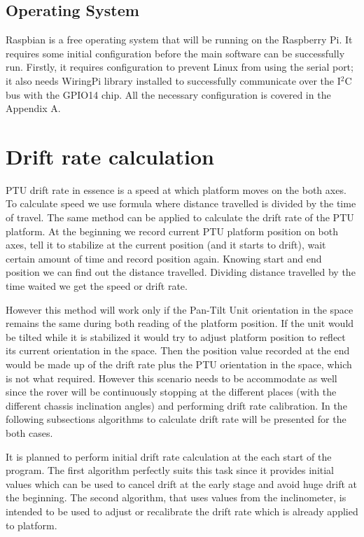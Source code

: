 \subsection{Operating System}
Raspbian is a free operating system that will be running on the Raspberry Pi. It requires some initial configuration before the main software can be successfully run. Firstly, it requires configuration to prevent Linux from using the serial port; it also needs WiringPi library \cite{WiringPi} installed to successfully communicate over the I$^2$C bus with the GPIO14 chip. All the necessary configuration is covered in the Appendix A. 

\section{Drift rate calculation}
PTU drift rate in essence is a speed at which platform moves on the both axes. To calculate speed we use formula where distance travelled is divided by the time of travel. The same method can be applied to calculate the drift rate of the PTU platform. At the beginning we record current PTU platform position on both axes, tell it to stabilize at the current position (and it starts to drift), wait certain amount of time and record position again. Knowing start and end position we can find out the distance travelled. Dividing distance travelled by the time waited we get the speed or drift rate. 

However this method will work only if the Pan-Tilt Unit orientation in the space remains the same during both reading of the platform position. If the unit would be tilted while it is stabilized it would try to adjust platform position to reflect its current orientation in the space. Then the position value recorded at the end would be made up of the drift rate plus the PTU orientation in the space, which is not what required. However this scenario needs to be accommodate as well since the rover will be continuously stopping at the different places (with the different chassis inclination angles) and performing drift rate calibration. In the following subsections algorithms to calculate drift rate will be presented for the both cases. 

It is planned to perform initial drift rate calculation at the each start of the program. The first algorithm perfectly suits this task since it provides initial values which can be used to cancel drift at the early stage and avoid huge drift at the beginning. The second algorithm, that uses values from the inclinometer, is intended to be used to adjust or recalibrate the drift rate which is already applied to platform. 

